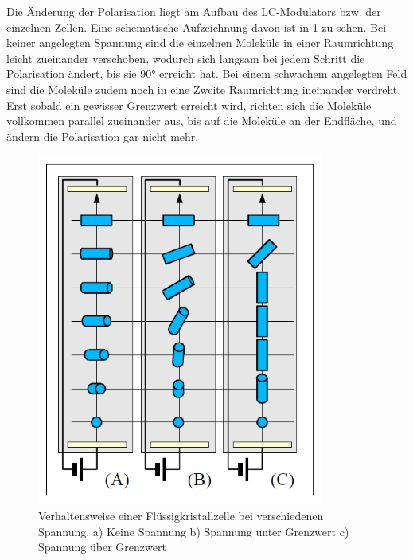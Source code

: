 Die Änderung der Polarisation liegt am Aufbau des LC-Modulators bzw. der einzelnen Zellen. Eine schematische Aufzeichnung davon ist in \cref{LC-Modul} zu sehen. Bei keiner angelegten Spannung sind die einzelnen Moleküle in einer Raumrichtung leicht zueinander verschoben, wodurch sich langsam  bei jedem Schritt die Polarisation ändert, 
bis sie 90° erreicht hat. Bei einem schwachem angelegten Feld sind die Moleküle zudem noch in eine Zweite Raumrichtung ineinander verdreht. Erst sobald ein gewisser Grenzwert erreicht wird, richten sich die Moleküle vollkommen parallel zueinander aus, bis auf die Moleküle an der Endfläche, und ändern die Polarisation gar nicht mehr. 


\begin{figure}[h!]
	\centering
	\includegraphics[scale=0.6]{LC-Zelle.png}
	\caption{Verhaltensweise einer Flüssigkristallzelle bei verschiedenen Spannung. a) Keine Spannung b) Spannung unter Grenzwert c) Spannung über Grenzwert}
	\label{LC-Modul}
\end{figure}

